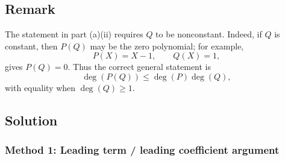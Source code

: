 \documentclass[12pt]{article}
\begin{document}
\subsection{Remark}
The statement in part (a)(ii) requires \(Q\) to be nonconstant. Indeed, if \(Q\) is constant, then \(P(Q)\) may be the zero polynomial; for example,
\[
P(X)=X-1,\qquad Q(X)=1,
\]
gives \(P(Q)=0\). Thus the correct general statement is
\[
\deg(P(Q))\le \deg(P)\deg(Q),
\]
with equality when \(\deg(Q)\ge 1\).

\subsection{Solution}

\subsubsection{Method 1: Leading term / leading coefficient argument}
\end{document}
